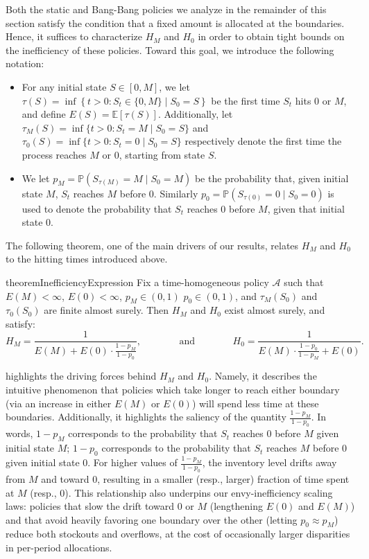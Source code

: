 \documentclass[mnsc,nonblindrev]{informs3}
\newcommand{\pr}{\mathbb{P}}
\begin{document}
Both the static and Bang-Bang policies we analyze in the remainder of this section satisfy the condition that a fixed amount is allocated at the boundaries.  Hence, it suffices to characterize $H_M$ and $H_0$ in order to obtain tight bounds on the inefficiency of these policies.
Toward this goal, we introduce the following notation:
\begin{itemize}
    \item For any initial state $S \in [0, M]$, we let $\tau(S) = \inf\left\{t > 0 : S_{t} \in \{0, M\} \mid S_0 = S \right\}$ be the first time $S_t$ hits $0$ or $M$, and define $E(S) = \mathbb{E}[\tau(S)]$. Additionally, let {$\tau_M(S) = \inf\{t > 0 : S_t = M \mid S_0 = S\}$ and $\tau_0(S) = \inf\{t > 0 : S_t = 0 \mid S_0 = S\}$ respectively denote the first time the process reaches $M$ or $0$, starting from state $S$.}
    \item We let $p_M = \pr(S_{\tau(M)} = M \mid S_0 = M)$ be the probability that, given initial state $M$, $S_t$ reaches $M$ before 0. Similarly  $p_0 = \pr(S_{\tau(0)} = 0 \mid S_0 = 0)$ is used to denote the probability that $S_t$ reaches 0 before $M$, given that initial state 0.
\end{itemize}

The following theorem, one of the main drivers of our results, relates $H_M$ and $H_0$ to the hitting times introduced above.

\begin{restatable}{theorem}{InefficiencyExpression} 
\label{Thm:Main_expression_for_inefficiency}
{Fix a time-homogeneous policy $\mathcal{A}$ such that $E(M) < \infty$, $E(0) < \infty$, $p_M \in (0,1)$ $p_0 \in (0,1)$, and $\tau_M(S_0)$ and $\tau_0(S_0)$ are finite almost surely.  Then $H_M$ and $H_0$ exist almost surely, and satisfy:}
\begin{equation}
\label{eq:hit_count}
    H_M = \frac{1}{E(M) + E(0)\cdot \frac{1-p_{M}}{1-p_{0}}},\;\;\;\;\;\;\;\;\;\;\;\;\;\; \text{and} \;\;\;\;\;\;\;\;\;\;\;\;\;\; H_0 = \frac{1 }{E(M)\cdot \frac{1-p_{0}}{1-p_{M}} + E(0)}.
\end{equation} 
\end{restatable}

 highlights the driving forces behind $H_M$ and $H_0$. Namely, it describes the intuitive phenomenon that policies which take longer to reach either boundary (via an increase in either $E(M)$ or $E(0)$) will spend less time at these boundaries. Additionally, it highlights the saliency of the quantity $\frac{1-p_M}{1-p_0}$. In words, $1-p_M$ corresponds to the probability that $S_t$ reaches 0 before $M$ given initial state $M$; $1-p_0$ corresponds to the probability that $S_t$ reaches $M$ before 0 given initial state 0. For higher values of $\frac{1-p_M}{1-p_0}$, the inventory level drifts away from $M$ and toward 0, resulting in a smaller (resp., larger) fraction of time spent at $M$ (resp., 0). This relationship also underpins our envy-inefficiency scaling laws: policies that slow the drift toward \(0\) or \(M\) (lengthening \(E(0)\) and \(E(M)\)) and that avoid heavily favoring one boundary over the other (letting \(p_0 \approx p_M\)) reduce both stockouts and overflows, at the cost of occasionally larger disparities in per-period allocations.
\end{document}
